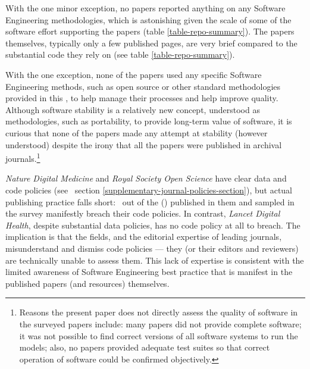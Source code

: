 \documentclass[10pt,a4paper]{article}
\begin{document}
With the one minor exception, no papers reported anything on any Software Engineering methodologies, which is astonishing given the scale of some of the software effort supporting the papers (table \ref{table-repo-summary}).  The papers themselves, typically only a few published pages, are very brief compared to the substantial code they rely on (see table \ref{table-repo-summary}). 

With the one exception, none of the papers used any specific Software Engineering methods, such as open source \cite{open-source} or other standard methodologies provided in this \supplement, to help manage their processes and help improve quality. Although software stability \cite{stability} is a relatively new concept, understood as methodologies, such as portability, to provide long-term value of software, it is curious that none of the papers made any attempt at stability (however understood) despite the irony that all the papers were published in archival journals.\footnote{Reasons the present paper does not directly assess the quality of software in the surveyed papers include: many papers did not provide complete software; it was not possible to find correct versions of all software systems to run the models; also, no papers provided adequate test suites so that correct operation of software could be confirmed objectively.}

\emph{Nature Digital Medicine\/} and \emph{Royal Society Open Science\/} have clear data and code policies (see \supplement\ section \ref{supplementary-journal-policies-section}), but actual publishing practice falls short: \the\countHasBreach\ out of the  (\pc{\countHasBreach}{\countHasPolicy}) published in them and sampled in the survey manifestly breach their code policies. In contrast, \emph{Lancet Digital Health\/}, despite substantial data policies, has no code policy at all to breach. The implication is that the fields, and the editorial expertise of leading journals, misunderstand and dismiss code policies --- they (or their editors and reviewers) are technically unable to assess them. This lack of expertise is consistent with the limited awareness of Software Engineering best practice that is manifest in the published papers (and resources) themselves.
\end{document}
